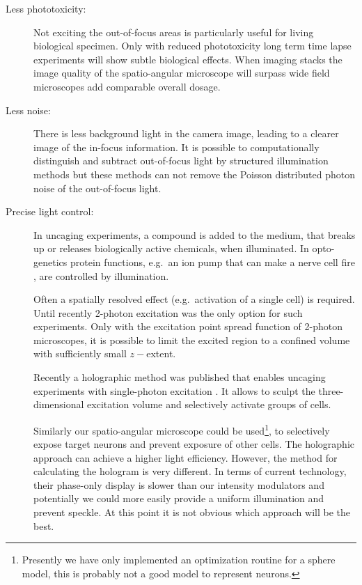 \begin{description}
\item[Less phototoxicity:] Not exciting the out-of-focus areas is
  particularly useful for living biological specimen. Only with
  reduced phototoxicity long term time lapse experiments will show
  subtle biological effects. When imaging stacks the image quality of
  the spatio-angular microscope will surpass wide field microscopes add
  comparable overall dosage.
\item[Less noise:] There is less background light in the camera image,
  leading to a clearer image of the in-focus information. It is
  possible to computationally distinguish and subtract out-of-focus
  light by structured illumination methods but these methods can not
  remove the Poisson distributed photon noise of the out-of-focus
  light.
\item[Precise light control:] In uncaging experiments, a compound is
  added to the medium, that breaks up or releases biologically active
  chemicals, when illuminated. In opto-genetics protein functions,
  e.g.\ an ion pump that can make a nerve cell fire \cite{Nagel2003},
  are controlled by illumination.

  Often a spatially resolved effect (e.g.\ activation of a single
  cell) is required. Until recently 2-photon excitation was the only
  option \citep{Pettit1997,Shoham2005} for such experiments. Only with
  the excitation point spread function of 2-photon microscopes, it is
  possible to limit the excited region to a confined volume with
  sufficiently small $z-$extent.

  Recently a holographic method was published that enables uncaging
  experiments with single-photon excitation \citep{Zahid2010}. It
  allows to sculpt the three-dimensional excitation volume and
  selectively activate groups of cells.

  Similarly our spatio-angular microscope could be
  used\footnote{Presently we have only implemented an optimization
    routine for a sphere model, this is probably not a good model to
    represent neurons.}, to selectively expose target neurons and
  prevent exposure of other cells. The holographic approach can
  achieve a higher light efficiency. However, the method for
  calculating the hologram is very different. In terms of current
  technology, their phase-only display is slower than our intensity
  modulators and potentially we could more easily provide a uniform
  illumination and prevent speckle. At this point it is not obvious
  which approach will be the best.
\end{description}

